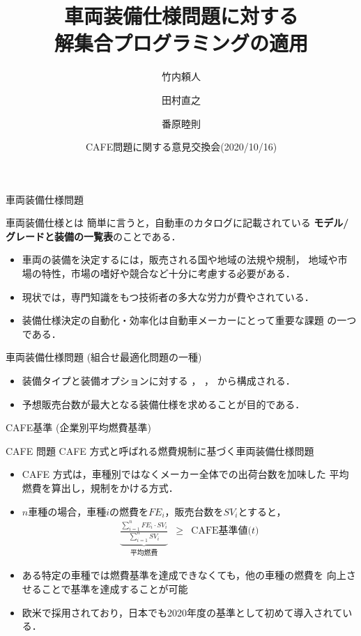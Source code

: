 \documentclass[dvipdfmx, 11pt]{beamer}
\title{車両装備仕様問題に対する\\解集合プログラミングの適用}
\author{竹内頼人\inst{1} \and 田村直之\inst{2} \and 番原睦則\inst{1}}
\institute{\inst{1}名古屋大学 大学院情報学研究科 \and \inst{2}神戸大学 情報基盤センター}
\date{CAFE問題に関する意見交換会(2020/10/16)}
\begin{document}
\frame{\titlepage}
\begin{frame}{車両装備仕様問題}
  \begin{alertblock}{車両装備仕様とは}
    簡単に言うと，自動車のカタログに記載されている
    \textbf{モデル/グレードと装備の一覧表}のことである．
  \end{alertblock}

  \begin{itemize}
  \item 車両の装備を決定するには，販売される国や地域の法規や規制，
    地域や市場の特性，市場の嗜好や競合など十分に考慮する必要がある．
  \item 現状では，専門知識をもつ技術者の多大な労力が費やされている．
  \item 装備仕様決定の自動化・効率化は自動車メーカーにとって重要な課題
    の一つである．
  \end{itemize}

  \begin{block}{車両装備仕様問題 (組合せ最適化問題の一種)}
    \begin{itemize}
    \item 装備タイプと装備オプションに対する
      ，
      ，
      から構成される．
    \item 予想販売台数が最大となる装備仕様を求めることが目的である．
    \end{itemize}
  \end{block}
\end{frame}
\begin{frame}{CAFE基準 (企業別平均燃費基準)}
  \begin{alertblock}{CAFE 問題}\centering
    CAFE 方式と呼ばれる燃費規制に基づく車両装備仕様問題~\footnotemark
  \end{alertblock}

  \begin{itemize}
  \item CAFE 方式は，車種別ではなくメーカー全体での出荷台数を加味した
    平均燃費を算出し，規制をかける方式．
  \item $n$車種の場合，車種$i$の燃費を$FE_i$，販売台数を$SV_i$とすると，
    \[
      \begin{array}{lcr}
        \underbrace{
        \frac{\sum_{i=1}^{n} FE_{i}\cdot SV_{i}}
        {\sum_{i=1}^{n} SV_{i}}}_{\textrm{平均燃費}
        }
        &
        \geq 
        &
        \textrm{CAFE基準値($t$)}
      \end{array}
    \]
  \item ある特定の車種では燃費基準を達成できなくても，他の車種の燃費を
    向上させることで基準を達成することが可能
  \item 欧米で採用されており，日本でも2020年度の基準として初めて導入されている．
  \end{itemize}
\end{frame}
\end{document}
